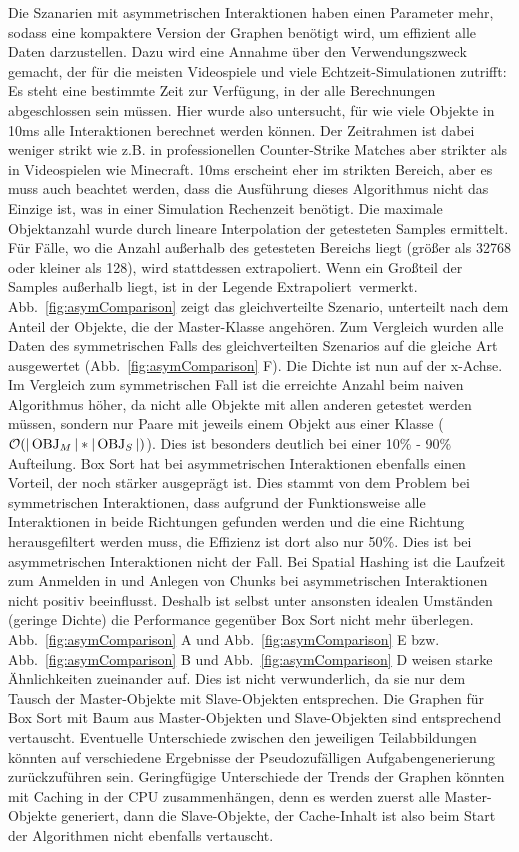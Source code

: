 Die Szanarien mit asymmetrischen Interaktionen haben einen Parameter mehr, sodass eine kompaktere Version der Graphen benötigt wird, um effizient alle Daten darzustellen. Dazu wird eine Annahme über den Verwendungszweck gemacht, der für die meisten Videospiele und viele Echtzeit-Simulationen zutrifft: Es steht eine bestimmte Zeit zur Verfügung, in der alle Berechnungen abgeschlossen sein müssen. Hier wurde also untersucht, für wie viele Objekte in 10ms alle Interaktionen berechnet werden können. Der Zeitrahmen ist dabei weniger strikt wie z.B. in professionellen Counter-Strike Matches aber strikter als in Videospielen wie Minecraft. 10ms erscheint eher im strikten Bereich, aber es muss auch beachtet werden, dass die Ausführung dieses Algorithmus nicht das Einzige ist, was in einer Simulation Rechenzeit benötigt. Die maximale Objektanzahl wurde durch lineare Interpolation der getesteten Samples ermittelt. Für Fälle, wo die Anzahl außerhalb des getesteten Bereichs liegt (größer als 32768 oder kleiner als 128), wird stattdessen extrapoliert. Wenn ein Großteil der Samples außerhalb liegt, ist in der Legende \glqq Extrapoliert\grqq ~vermerkt.\\
Abb.~\ref{fig:asymComparison} zeigt das gleichverteilte Szenario, unterteilt nach dem Anteil der Objekte, die der Master-Klasse angehören. Zum Vergleich wurden alle Daten des symmetrischen Falls des gleichverteilten Szenarios auf die gleiche Art ausgewertet (Abb.~\ref{fig:asymComparison} F). Die Dichte ist nun auf der x-Achse. Im Vergleich zum symmetrischen Fall ist die erreichte Anzahl beim naiven Algorithmus höher, da nicht alle Objekte mit allen anderen getestet werden müssen, sondern nur Paare mit jeweils einem Objekt aus einer Klasse ($\mathcal{O}(|\operatorname{OBJ}_M|*|\operatorname{OBJ}_S|)$). Dies ist besonders deutlich bei einer 10\% - 90\% Aufteilung. Box Sort hat bei asymmetrischen Interaktionen ebenfalls einen Vorteil, der noch stärker ausgeprägt ist. Dies stammt von dem Problem bei symmetrischen Interaktionen, dass aufgrund der Funktionsweise alle Interaktionen in beide Richtungen gefunden werden und die eine Richtung herausgefiltert werden muss, die Effizienz ist dort also nur 50\%. Dies ist bei asymmetrischen Interaktionen nicht der Fall. Bei Spatial Hashing ist die Laufzeit zum Anmelden in und Anlegen von Chunks bei asymmetrischen Interaktionen nicht positiv beeinflusst. Deshalb ist selbst unter ansonsten idealen Umständen (geringe Dichte) die Performance gegenüber Box Sort nicht mehr überlegen.\\
Abb.~\ref{fig:asymComparison} A und Abb.~\ref{fig:asymComparison} E bzw. Abb.~\ref{fig:asymComparison} B und Abb.~\ref{fig:asymComparison} D weisen starke Ähnlichkeiten zueinander auf. Dies ist nicht verwunderlich, da sie nur dem Tausch der Master-Objekte mit Slave-Objekten entsprechen. Die Graphen für Box Sort mit Baum aus Master-Objekten und Slave-Objekten sind entsprechend vertauscht. Eventuelle Unterschiede zwischen den jeweiligen Teilabbildungen könnten auf verschiedene Ergebnisse der Pseudozufälligen Aufgabengenerierung zurückzuführen sein. Geringfügige Unterschiede der Trends der Graphen könnten mit Caching in der CPU zusammenhängen, denn es werden zuerst alle Master-Objekte generiert, dann die Slave-Objekte, der Cache-Inhalt ist also beim Start der Algorithmen nicht ebenfalls vertauscht.\\
